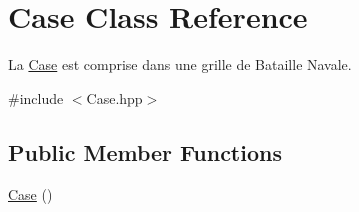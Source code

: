 \hypertarget{classCase}{\section{Case Class Reference}
\label{classCase}
}


La \hyperlink{classCase}{Case} est comprise dans une grille de Bataille Navale.  




{\ttfamily \#include $<$Case.\-hpp$>$}

\subsection*{Public Member Functions}
\begin{DoxyCompactItemize}
\item 
\hypertarget{classCase_a14237e17aab1829965adab76b747db6c}{\hyperlink{classCase_a14237e17aab1829965adab76b747db6c}{Case} ()}\label{classCase_a14237e17aab1829965adab76b747db6c}


\end{DoxyCompactItemize}
